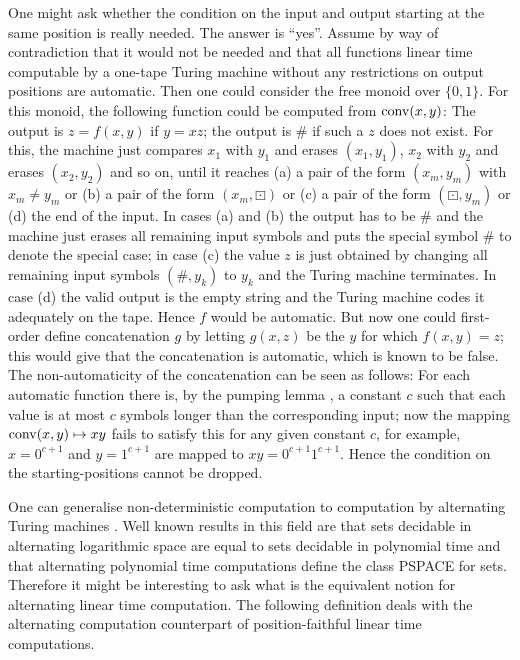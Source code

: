 \documentclass{LMCS}
\theoremstyle{plain}\newtheorem{athm}[thm]{Theorem}
\theoremstyle{plain}\newtheorem{aprop}[thm]{Proposition}
\theoremstyle{plain}\newtheorem{aprob}[thm]{Open Problem}
\theoremstyle{plain}\newtheorem{acor}[thm]{Corollary}
\theoremstyle{plain}\newtheorem{alem}[thm]{Lemma}
\theoremstyle{definition}\newtheorem{adefn}[thm]{Definition}
\theoremstyle{definition}\newtheorem{arem}[thm]{Remark}
\theoremstyle{plain}\newtheorem{aexmp}[thm]{Example}
\theoremstyle{plain}\newtheorem{aclm}[thm]{Claim}
\def\conv{{\rm{conv}}}
\begin{document}
\begin{rem}
One might ask whether the condition on the input and output starting at
the same position is really needed. The answer is ``yes''. Assume by way
of contradiction that it would not be needed and that all functions linear
time computable by a one-tape Turing machine without any restrictions on
output positions are automatic. Then one could consider the free monoid
over $\{0,1\}$. For this monoid, the following function could be computed
from $\conv(x,y)$: The output is $z=f(x,y)$ if $y = xz$; the output is $\#$
if such a $z$ does not exist. For this, the machine just compares $x_1$ with
$y_1$ and erases $(x_1,y_1)$, $x_2$ with $y_2$ and erases $(x_2,y_2)$ and so on,
until it reaches (a) a pair of the form $(x_m,y_m)$ with $x_m \neq y_m$
or (b) a pair of the form $(x_m,\boxdot)$ or (c) a pair of the form
$(\boxdot,y_m)$
or (d) the end of the input.
In cases (a) and (b) the output has to be $\#$ and the machine just erases
all remaining input symbols and puts the special symbol $\#$ to denote the
special case; in case (c) the value $z$ is just obtained by changing
all remaining input symbols $(\#,y_k)$ to $y_k$ and the Turing machine
terminates. In case (d) the valid output is the empty string and the
Turing machine codes it adequately on the tape. Hence $f$ would be
automatic. But now one could first-order define concatenation $g$ by
letting $g(x,z)$ be the $y$ for which $f(x,y) = z$; this would give
that the concatenation is automatic, which is known to be 
false. The non-automaticity of the concatenation can be seen
as follows: For each automatic function there
is, by the pumping lemma \cite{HMU01}, a constant $c$ such that
each value is at most $c$ symbols longer than the corresponding input; now the
mapping $\conv(x,y) \mapsto xy$ fails to satisfy this for any given
constant $c$, for example, $x = 0^{c+1}$ and $y=1^{c+1}$ are
mapped to $xy = 0^{c+1}1^{c+1}$.
Hence the condition on the starting-positions cannot be dropped.
\end{rem}

\noindent
One can generalise non-deterministic computation to computation
by alternating Turing machines \cite{CKS81}.
Well known results in this field \cite{CKS81}
are that sets decidable in alternating logarithmic space are equal
to sets decidable in polynomial time and
that alternating polynomial time computations define the class
PSPACE for sets. Therefore it might be interesting
to ask what is the equivalent notion for alternating linear time computation.
The following definition deals with the
alternating computation counterpart of position-faithful linear
time computations.
\end{document}
